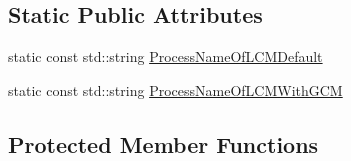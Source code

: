 \subsection*{Static Public Attributes}
\begin{DoxyCompactItemize}
\item 
static const std\+::string \hyperlink{classmts_manager_local_af1eb58312e2aae8668b7cdc00b211c31}{Process\+Name\+Of\+L\+C\+M\+Default}
\item 
static const std\+::string \hyperlink{classmts_manager_local_a4210fa8488468453764d5788f6c041a2}{Process\+Name\+Of\+L\+C\+M\+With\+G\+C\+M}
\end{DoxyCompactItemize}
\subsection*{Protected Member Functions}

